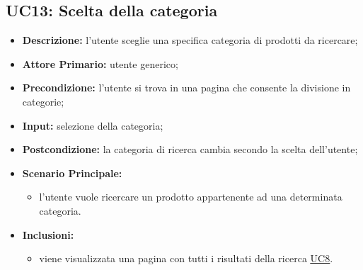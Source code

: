 \subsection{UC13: Scelta della categoria}
\label{sec:UC13}
\begin{itemize}
    \item \textbf{Descrizione:} l'utente sceglie una specifica categoria di prodotti da ricercare;
    \item \textbf{Attore Primario:} utente generico;
    \item \textbf{Precondizione:} l'utente si trova in una pagina che consente la divisione in categorie;
    \item \textbf{Input:} selezione della categoria;
    \item \textbf{Postcondizione:} la categoria di ricerca cambia secondo la scelta dell'utente;
    \item \textbf{Scenario Principale:}
    \begin{itemize}
        \item l'utente vuole ricercare un prodotto appartenente ad una determinata categoria.
    \end{itemize} 
    \item \textbf{Inclusioni:}
    \begin{itemize}
        \item viene visualizzata una pagina con tutti i risultati della ricerca \hyperref[sec:UC8]{\underline{UC8}}.
    \end{itemize}
\end{itemize}